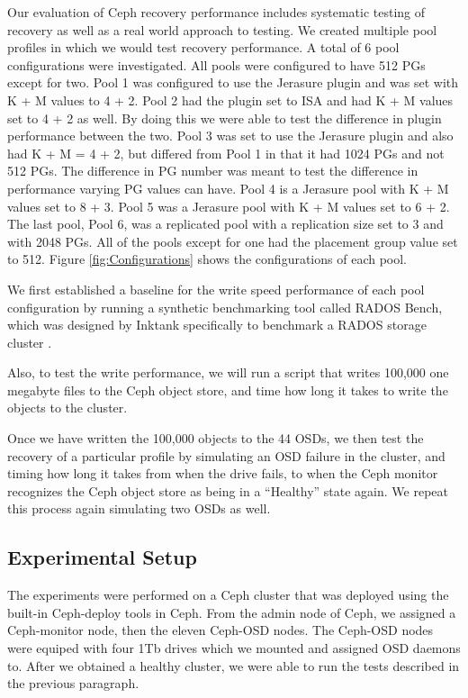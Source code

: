 \documentclass[conference,compsoc]{IEEEtran}
\begin{document}
Our evaluation of Ceph recovery performance includes systematic testing of recovery as well as a real world approach to testing. We created multiple pool profiles in which we would test recovery performance. A total of 6 pool configurations were investigated. All pools were configured to have 512 PGs except for two. Pool 1 was configured to use the Jerasure plugin and was set with K + M values to 4 + 2. Pool 2 had the plugin set to ISA and had K + M values set to 4 + 2 as well. By doing this we were able to test the difference in plugin performance between the two. Pool 3 was set to use the Jerasure plugin and also had K + M = 4 + 2, but differed from Pool 1 in that it had 1024 PGs and not 512 PGs. The difference in PG number was meant to test the difference in performance varying PG values can have. Pool 4 is a Jerasure pool with K + M values set to 8 + 3. Pool 5 was a Jerasure pool with K + M values set to 6 + 2. The last pool, Pool 6, was a replicated pool with a replication size set to 3 and with 2048 PGs. All of the pools except for one had the placement group value set to 512. Figure \ref{fig:Configurations} shows the configurations of each pool. 

We first established a baseline for the write speed performance of each pool configuration by running a synthetic benchmarking tool called RADOS Bench, which was designed by Inktank specifically to benchmark a RADOS storage cluster \cite{wang_evaluation}. 

Also, to test the write performance, we will run a script that writes 100,000 one megabyte files to the Ceph object store, and time how long it takes to write the objects to the cluster. 

Once we have written the 100,000 objects to the 44 OSDs, we then test the recovery of a particular profile by simulating an OSD failure in the cluster, and timing how long it takes from when the drive fails, to when the Ceph monitor recognizes the Ceph object store as being in a ``Healthy'' state again. We repeat this process again simulating two OSDs as well.  

\subsection{Experimental Setup}

The experiments were performed on a Ceph cluster that was deployed using the built-in Ceph-deploy tools in Ceph. From the admin node of Ceph, we assigned a Ceph-monitor node, then the eleven Ceph-OSD nodes. The Ceph-OSD nodes were equiped with four 1Tb drives which we mounted and assigned OSD daemons to. After we obtained a healthy cluster, we were able to run the tests described in the previous paragraph. 
\end{document}

